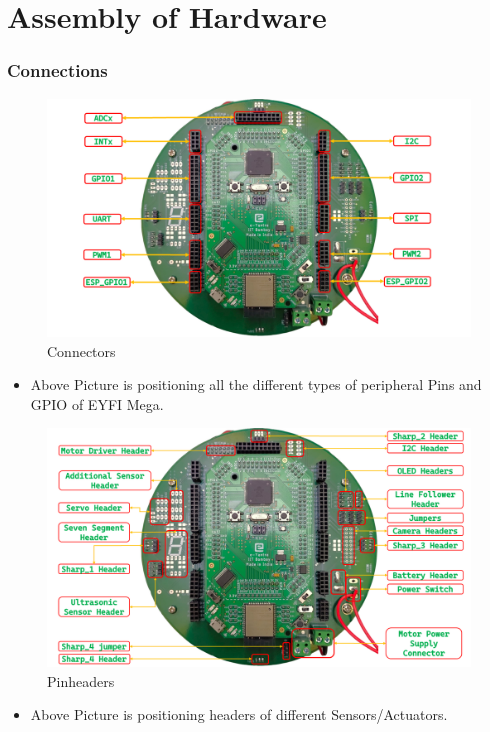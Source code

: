 \documentclass[12pt,a4paper,oneside]{book}
\begin{document}
    \pagebreak
		
		
	\section*{Assembly of Hardware}
		\subsubsection*{Connections}
			\begin{figure}[H]
				\begin{center}
					\includegraphics[scale=0.45]{PCB_FRONT_SIDE_1}
					\caption{Connectors}
				\end{center}
			\end{figure}
			\begin{itemize}
				\item Above Picture is positioning all the different types of peripheral Pins and GPIO of EYFI Mega. 
			\end{itemize}

			\begin{figure}[H]
				\begin{center}
					\includegraphics[scale=0.45]{PCB_FRONT_SIDE_2}
					\caption{Pinheaders}
				\end{center}
			\end{figure}
			\begin{itemize}
				\item Above Picture is positioning headers of different Sensors/Actuators. 
			\end{itemize}
\end{document}
